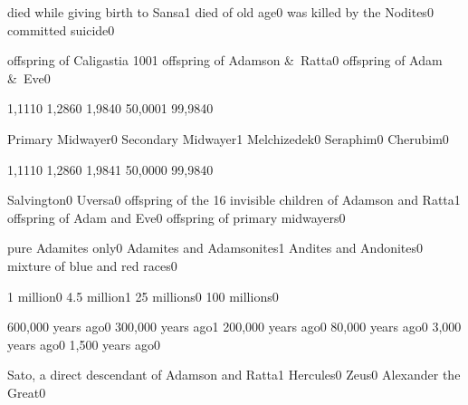 {died while giving birth to Sansa}{1}
{died of old age}{0}
{was killed by the Nodites}{0}
{committed suicide}{0}
\qstop


{offspring of Caligastia 100}{1}
{offspring of Adamson \&\ Ratta}{0}
{offspring of Adam \&\ Eve}{0}
\qstop

{1,111}{0}
{1,286}{0}
{1,984}{0}
{50,000}{1}
{99,984}{0}
\qstop


{Primary Midwayer}{0}
{Secondary Midwayer}{1}
{Melchizedek}{0}
{Seraphim}{0}
{Cherubim}{0}
\qstop

{1,111}{0}
{1,286}{0}
{1,984}{1}
{50,000}{0}
{99,984}{0}
\qstop

{Salvington}{0}
{Uversa}{0}
{offspring of the 16 invisible children of Adamson and Ratta}{1}
{offspring of Adam and Eve}{0}
{offspring of primary midwayers}{0}
\qstop


{pure Adamites only}{0}
{Adamites and Adamsonites}{1}
{Andites and Andonites}{0}
{mixture of blue and red races}{0}
\qstop

{1 million}{0}
{4.5 million}{1}
{25 millions}{0}
{100 millions}{0}
\qstop


{600,000 years ago}{0}
{300,000 years ago}{1}
{200,000 years ago}{0}
{80,000 years ago}{0}
{3,000 years ago}{0}
{1,500 years ago}{0}
\qstop


{Sato, a direct descendant of Adamson and Ratta}{1}
{Hercules}{0}
{Zeus}{0}
{Alexander the Great}{0}
\qstop



